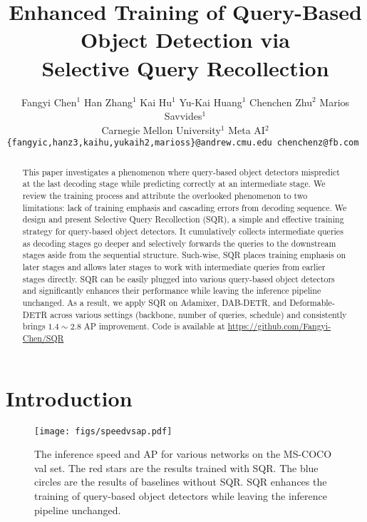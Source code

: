 \documentclass[10pt,twocolumn,letterpaper]{article}
\begin{document}
\title{Enhanced Training of Query-Based Object Detection via \\ Selective Query Recollection}

\author{Fangyi Chen$^1$ \quad Han Zhang$^1$ \quad Kai Hu$^1$ \quad Yu-Kai Huang$^1$ \quad Chenchen Zhu$^2$ \quad Marios Savvides$^1$\\
Carnegie Mellon University$^1$ \qquad Meta AI$^2$\\
{\tt\small \{fangyic,hanz3,kaihu,yukaih2,marioss\}@andrew.cmu.edu \quad chenchenz@fb.com }
}
\maketitle



\begin{abstract}
    This paper investigates a phenomenon where query-based object detectors mispredict at the last decoding stage while predicting correctly at an intermediate stage. We review the training process and attribute the overlooked phenomenon to two limitations: 
    lack of training emphasis and cascading errors from decoding sequence.
    We design and present Selective Query Recollection (SQR), a simple and effective training strategy for query-based object detectors. 
    It cumulatively collects intermediate queries as decoding stages go deeper and selectively forwards the queries to the downstream stages aside from the sequential structure. 
    Such-wise, SQR places training emphasis on later stages and allows later stages to work with intermediate queries from earlier stages directly. SQR can be easily plugged into various query-based object detectors and significantly enhances their performance while leaving the inference pipeline unchanged. As a result, we apply SQR on Adamixer, DAB-DETR, and Deformable-DETR across various settings (backbone, number of queries, schedule) and consistently brings $1.4\sim2.8$ AP improvement. Code is available at \url{https://github.com/Fangyi-Chen/SQR}
\end{abstract}

\section{Introduction}
\label{sec:intro}

\begin{figure}
    \centering
    \texttt{[image: figs/speedvsap.pdf]}
    \caption{The inference speed and AP for various networks on the MS-COCO val set. The red stars are the results trained with SQR. The blue circles are the results of baselines without SQR. SQR enhances the training of query-based object detectors while leaving the inference pipeline unchanged.}
    \label{fig:speedvsap}
\end{figure}
\end{document}
